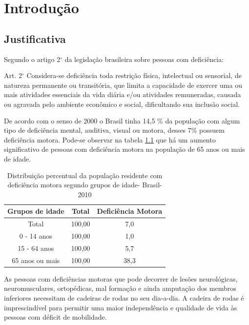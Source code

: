 \chapter[Introdução]{Introdução}

\section{Justificativa}
Segundo o artigo 2$^{\circ}$ da legislação brasileira sobre pessoas com deficiência:
\begin{citacao}
Art. 2$^{\circ}$ Considera-se deficiência toda restrição física, intelectual ou sensorial, de natureza permanente ou transitória, que limita a capacidade de exercer uma ou mais atividades essenciais da vida diária e/ou atividades remuneradas, causada ou agravada pelo ambiente econômico e social, dificultando sua inclusão social.
\end{citacao}

De acordo com o senso de 2000 o Brasil tinha 14,5 \% da população com algum tipo de deficiência mental, auditiva, visual ou motora, desses 7\% possuem deficiência motora.  Pode-se observar na tabela \ref{tab:ibge} que há um aumento significativo de pessoas com deficiência motora na população de 65 anos ou mais de idade.

\begin{table}[ht!]
\centering
\caption{Distribuição percentual da população residente com deficiência motora segundo grupos de idade- Brasil-2010}
\begin{tabular}{|c|c|c|}
\hline
Grupos de idade & Total  & Deficiência Motora \\ \hline

Total           & 100,00 & 7,0                \\ \hline
0 - 14 anos       & 100,00 & 1,0                \\ \hline
15 - 64 anos    & 100,00 & 5,7                \\ \hline
65 anos ou mais & 100,00 & 38,3              \\ \hline

\end{tabular}
\label{tab:ibge}
\end{table}

As pessoas com deficiências motoras que pode decorrer de lesões neurológicas, neuromusculares, ortopédicas, mal formação e ainda amputação dos membros inferiores necessitam de cadeiras de rodas no seu dia-a-dia. A cadeira de rodas é imprescindível para permitir uma maior independência e qualidade de vida às pessoas com déficit de mobilidade. \cite{relatorio_sus}

